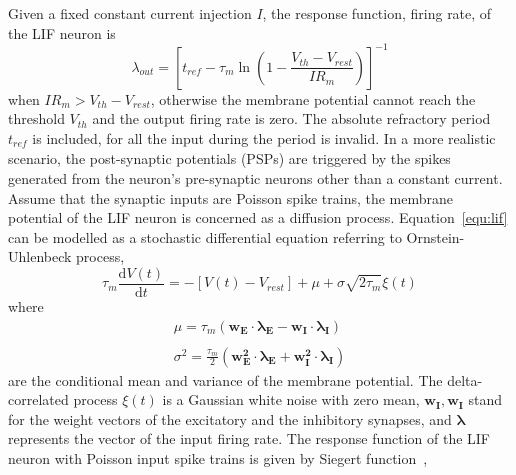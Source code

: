 \documentclass[journal]{journal}
\def\D{\mathrm{d}}
\begin{document}
Given a fixed constant current injection $I$, the response function, firing rate, of the LIF neuron is
\begin{equation}
\lambda_\mathit{out}=
\left [ t_\mathit{ref}-\tau_m\ln \left ( 1-\frac{V_{th}-V_\mathit{rest}}{IR_m}  \right )\right ]^{-1}
\label{equ:consI}
\end{equation}
when $IR_m>V_{th}-V_{rest}$, otherwise the membrane potential cannot reach the threshold $V_{th}$ and the output firing rate is zero. 
The absolute refractory period $t_\mathit{ref}$ is included, for all the input during the period is invalid.
In a more realistic scenario, the post-synaptic potentials (PSPs) are triggered by the spikes generated from the neuron's pre-synaptic neurons other than a constant current.
Assume that the synaptic inputs are Poisson spike trains, the membrane potential of the LIF neuron is concerned as a diffusion process. Equation~\ref{equ:lif} can be modelled as a stochastic differential equation referring to Ornstein-Uhlenbeck process,
\begin{equation}
\tau_m\frac{\D V(t)}{\D t}=-\left[V(t)-V_\mathit{rest}\right] + \mu + \sigma\sqrt{2\tau_m}\xi (t)
\label{equ:sde}
\end{equation}
where
\begin{equation}
\begin{array}{l}
\mu=\tau_m(\mathbf{w_E\cdot\lambda_E}-\mathbf{w_I\cdot\lambda_I})
\\
\\
\sigma ^{2} = \frac{\tau_m}{2}\left(\mathbf{w_E^{2}\cdot\lambda_E}+\mathbf{w_I^{2}\cdot\lambda_I}\right)
\end{array}
\label{equ:ou}
\end{equation}
are the conditional mean and variance of the membrane potential.
The delta-correlated process $\xi(t)$ is a Gaussian white noise with zero mean, $\mathbf{w_I},\mathbf{w_I}$ stand for the weight vectors of the excitatory and the inhibitory synapses, and $\mathbf{\lambda}$ represents the vector of the input firing rate.
The response function of the LIF neuron with Poisson input spike trains is given by Siegert function~\cite{siegert1951first}, 
\end{document}
